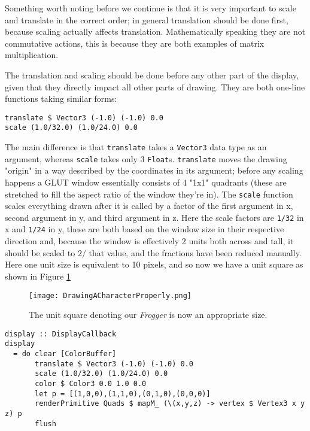 \documentclass[12pt, a4paper]{report}
\begin{document}
\par

Something worth noting before we continue is that it is very important to scale and translate in the correct order; in general translation should be done first, because scaling actually affects translation.
Mathematically speaking they are not commutative actions, this is because they are both examples of matrix multiplication.

\par

The translation and scaling should be done before any other part of the display, given that they directly impact all other parts of drawing.
They are both one-line functions taking similar forms:

\begin{lstlisting}
translate $ Vector3 (-1.0) (-1.0) 0.0
scale (1.0/32.0) (1.0/24.0) 0.0
\end{lstlisting}

The main difference is that \verb|translate| takes a \verb|Vector3| data type as an argument, whereas \verb|scale| takes only 3 \verb|Float|s.
\verb|translate| moves the drawing "origin" in a way described by the coordinates in its argument; before any scaling happens a GLUT window essentially consists of 4 "1x1" quadrants (these are stretched to fill the aspect ratio of the window they're in).
The \verb|scale| function scales everything drawn after it is called by a factor of the first argument in x, second argument in y, and third argument in z.
Here the scale factors are \verb|1/32| in x and \verb|1/24| in y, these are both based on the window size in their respective direction and, because the window is effectively 2 units both across and tall, it should be scaled to $2/$ that value, and the fractions have been reduced manually.
Here one unit size is equivalent to 10 pixels, and so now we have a unit square as shown in Figure \ref{fig:drawingacharacterproperly}

\begin{figure}[ht]
  \centering
  \caption{The unit square denoting our \textit{Frogger} is now an appropriate size.}
  \texttt{[image: DrawingACharacterProperly.png]}
  \label{fig:drawingacharacterproperly}
\end{figure}

\begin{lstlisting}[xleftmargin=-0.1\textwidth, xrightmargin=-0.1\textwidth]
display :: DisplayCallback
display
  = do clear [ColorBuffer]
       translate $ Vector3 (-1.0) (-1.0) 0.0
       scale (1.0/32.0) (1.0/24.0) 0.0
       color $ Color3 0.0 1.0 0.0
       let p = [(1,0,0),(1,1,0),(0,1,0),(0,0,0)]
       renderPrimitive Quads $ mapM_ (\(x,y,z) -> vertex $ Vertex3 x y z) p
       flush
\end{lstlisting}
\end{document}
